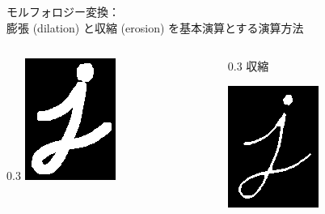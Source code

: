 \documentclass[10pt]{beamer}
\begin{document}
\begin{frame}{モルフォロジー変換：\\膨張 (dilation) と収縮 (erosion) を基本演算とする演算方法}
\begin{columns}
\begin{column}[c]{0.3\hsize}
    	        \includegraphics[width=0.9\hsize]{figs/dilation.png}
	        \end{column}
	        \begin{column}[c]{0.3\hsize}\centering
	            収縮 \par
    	        \includegraphics[width=0.9\hsize]{figs/erosion.png}

\end{column}
\end{columns}
\end{frame}
\end{document}
